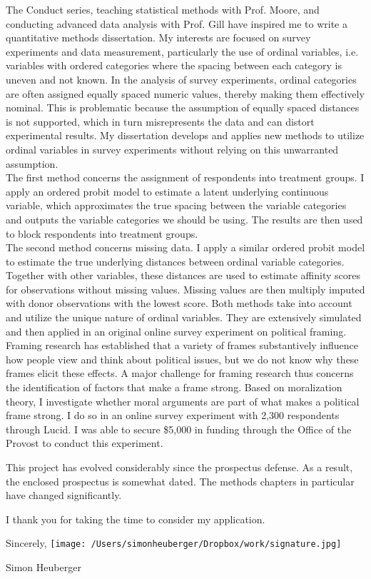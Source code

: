 \documentclass[10pt,letterpaper,dateno,sigleft]{newlfm}
\begin{document}
\begin{newlfm}
The Conduct series, teaching statistical methods with Prof. Moore, and conducting advanced data analysis with Prof. Gill have inspired me to write a quantitative methods dissertation. My interests are focused on survey experiments and data measurement, particularly the use of ordinal variables, i.e. variables with ordered categories where the spacing between each category is uneven and not known. In the analysis of survey experiments, ordinal categories are often assigned equally spaced numeric values, thereby making them effectively nominal. This is problematic because the assumption of equally spaced distances is not supported, which in turn misrepresents the data and can distort experimental results. My dissertation develops and applies new methods to utilize ordinal variables in survey experiments without relying on this unwarranted assumption. \\
The first method concerns the assignment of respondents into treatment groups. I apply an ordered probit model to estimate a latent underlying continuous variable, which approximates the true spacing between the variable categories and outputs the variable categories we should be using. The results are then used to block respondents into treatment groups. \\
The second method concerns missing data. I apply a similar ordered probit model to estimate the true underlying distances between ordinal variable categories. Together with other variables, these distances are used to estimate affinity scores for observations without missing values. Missing values are then multiply imputed with donor observations with the lowest score. 
Both methods take into account and utilize the unique nature of ordinal variables. They are extensively simulated and then applied in an original online survey experiment on political framing.\\
Framing research has established that a variety of frames substantively influence how people view and think about political issues, but we do not know why these frames elicit these effects. A major challenge for framing research thus concerns the identification of factors that make a frame strong. Based on moralization theory, I investigate whether moral arguments are part of what makes a political frame strong. I do so in an online survey experiment with 2,300 respondents through Lucid. I was able to secure \$5,000 in funding through the Office of the Provost to conduct this experiment.


This project has evolved considerably since the prospectus defense. As a result, the enclosed prospectus is somewhat dated. The methods chapters in particular have changed significantly.

\vspace{0.15cm}
I thank you for taking the time to consider my application.

\vspace{0.15cm}

Sincerely, 
\newline \newline \texttt{[image: /Users/simonheuberger/Dropbox/work/signature.jpg]}

Simon Heuberger


\end{newlfm}
\end{document}
